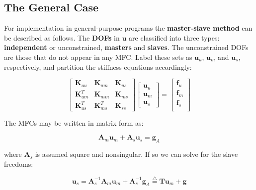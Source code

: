\documentclass[10pt,b5paper,titlepage]{book}
\newcommand*\eqd{\stackrel{\triangle}{=}}
\begin{document}
\subsection{The General Case}

For implementation in general-purpose programs the \textbf{master-slave method}
can be described as follows. The \textbf{DOFs} in $ \mathbf{u} $ are classified
into three types: \textbf{independent} or unconstrained, \textbf{masters} and
\textbf{slaves}. The unconstrained DOFs are those that do not appear in any MFC.
Label these sets as $ \mathbf{u}_u $, $ \mathbf{u}_m $ and $ \mathbf{u}_s $,
respectively, and partition the stiffness equations accordingly:

\begin{equation}\label{mfc-ms-partitioned}
    \begin{bmatrix}
        \mathbf{K}_{uu} & \mathbf{K}_{um} & \mathbf{K}_{us} \\
        \mathbf{K}_{um}^T & \mathbf{K}_{mm} & \mathbf{K}_{ms} \\
        \mathbf{K}_{us}^T & \mathbf{K}_{ms}^T & \mathbf{K}_{ss}
    \end{bmatrix}
    \begin{bmatrix}
        \mathbf{u}_u \\
        \mathbf{u}_m \\
        \mathbf{u}_s
    \end{bmatrix}
    = \begin{bmatrix}
        \mathbf{f}_u \\
        \mathbf{f}_m \\
        \mathbf{f}_s \\
    \end{bmatrix}
\end{equation}

The MFCs may be written in matrix form as:

\begin{equation}
    \mathbf{A}_m \mathbf{u}_m + \mathbf{A}_s \mathbf{u}_s = \mathbf{g}_A
\end{equation}

where $ \mathbf{A}_s $ is assumed square and nonsingular. If so we can solve for
the slave freedoms:

\begin{equation}
    \mathbf{u}_s = \mathbf{A}_s^{-1} \mathbf{A}_m \mathbf{u}_m
    + \mathbf{A}_s^{-1} \mathbf{g}_A
    \eqd \mathbf{T} \mathbf{u}_m + \mathbf{g}
\end{equation}
\end{document}
